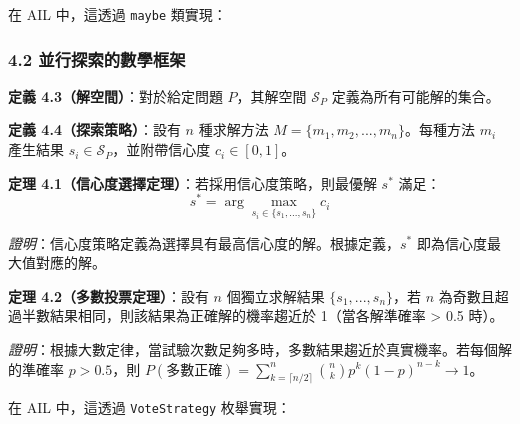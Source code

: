 在 AIL 中，這透過 \texttt{maybe} 類實現：

\begin{Shaded}
\begin{Highlighting}[]
\OperatorTok{=}\OperatorTok{=}\NormalTok{)}
\end{Highlighting}
\end{Shaded}

\subsubsection{4.2
並行探索的數學框架}\label{ux4e26ux884cux63a2ux7d22ux7684ux6578ux5b78ux6846ux67b6}

\textbf{定義 4.3（解空間）}：對於給定問題 \(P\)，其解空間
\(\mathcal{S}_P\) 定義為所有可能解的集合。

\textbf{定義 4.4（探索策略）}：設有 \(n\) 種求解方法
\(M = \{m_1, m_2, ..., m_n\}\)。每種方法 \(m_i\) 產生結果
\(s_i \in \mathcal{S}_P\)，並附帶信心度 \(c_i \in [0, 1]\)。

\textbf{定理 4.1（信心度選擇定理）}：若採用信心度策略，則最優解 \(s^*\)
滿足： \[s^* = \arg\max_{s_i \in \{s_1, ..., s_n\}} c_i\]

\emph{證明}：信心度策略定義為選擇具有最高信心度的解。根據定義，\(s^*\)
即為信心度最大值對應的解。

\textbf{定理 4.2（多數投票定理）}：設有 \(n\) 個獨立求解結果
\(\{s_1, ..., s_n\}\)，若 \(n\)
為奇數且超過半數結果相同，則該結果為正確解的機率趨近於 1（當各解準確率
\textgreater{} 0.5 時）。

\emph{證明}：根據大數定律，當試驗次數足夠多時，多數結果趨近於真實機率。若每個解的準確率
\(p > 0.5\)，則
\(P(\text{多數正確}) = \sum_{k=\lceil n/2 \rceil}^{n} \binom{n}{k} p^k (1-p)^{n-k} \to 1\)。

在 AIL 中，這透過 \texttt{VoteStrategy} 枚舉實現：

\begin{Shaded}
\begin{Highlighting}[]
\OperatorTok{=} \OperatorTok{=}

\OperatorTok{=} \OperatorTok{=}
\end{Highlighting}
\end{Shaded}

